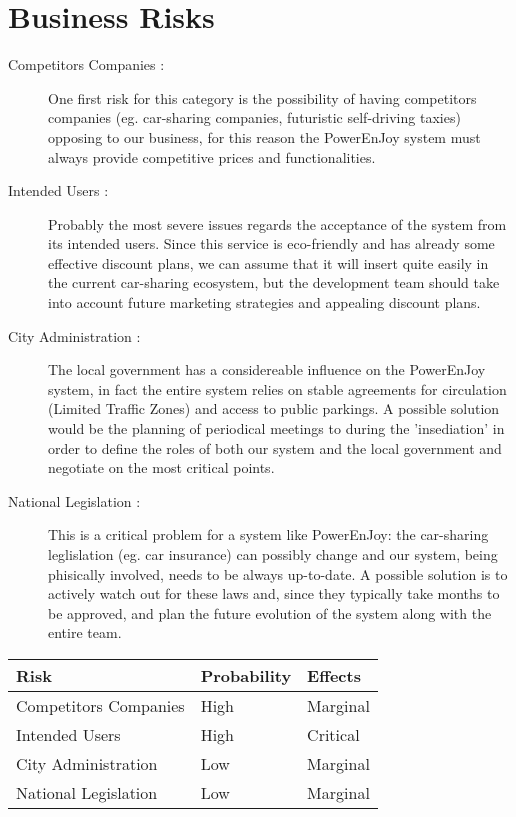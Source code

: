 \section{Business Risks}
\begin{description}
	\item [Competitors Companies :] One first risk for this category is the possibility of having competitors companies (eg. car-sharing companies, futuristic self-driving taxies) opposing to our business, for this reason the PowerEnJoy system must always provide competitive prices and functionalities.
	\item[Intended Users :] Probably the most severe issues regards the acceptance of the system from its intended users. Since this service is eco-friendly and has already some effective discount plans, we can assume that it will insert quite easily in the current car-sharing ecosystem, but the development team should take into account future marketing strategies and appealing discount plans.
	\item [City Administration :] The local government has a considereable influence on the PowerEnJoy system, in fact the entire system relies on stable agreements for circulation (Limited Traffic Zones) and access to public parkings. A possible solution would be the planning of periodical meetings to during the 'insediation' in order to define the roles of both our system and the local government and negotiate on the most critical points.
	\item [National Legislation :] This is a critical problem for a system like PowerEnJoy: the car-sharing leglislation (eg. car insurance) can possibly change and our system, being phisically involved, needs to be always up-to-date. A possible solution is to actively watch out for these laws and, since they typically take months to be approved, and plan the future evolution of the system along with the entire team.
\end{description}

\begin{center}
  \begin{tabular}{ |l|l|l| }
    \hline
    Risk & Probability & Effects \\ \hline
    Competitors Companies & High & Marginal \\ \hline
    Intended Users & High & Critical \\ \hline
    City Administration & Low & Marginal \\ \hline
    National Legislation & Low & Marginal \\ \hline
  \end{tabular}
\end{center}
